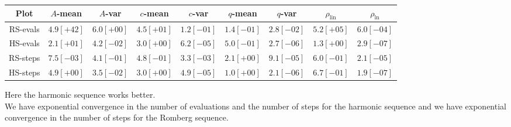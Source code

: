 \begin{table}[H]
    \centering
    \small
    \begin{tabular}{c||c|c|c|c|c|c|c|c}
Plot & \(A\)-mean & \(A\)-var & \(c\)-mean & \(c\)-var & \(q\)-mean & \(q\)-var & \(\rho_{\operatorname{lin}}\) & \(\rho_{\ln}\)\\\hline
\rowcolor{red}
RS-evals & \(4.9[+42]\) & \(6.0[+00]\) & \(4.5[+01]\) & \(1.2[-01]\) & \(1.4[-01]\) & \(2.8[-02]\) & \(5.2[+05]\) & \(6.0[-04]\) \\
\rowcolor{green}
HS-evals & \(2.1[+01]\) & \(4.2[-02]\) & \(3.0[+00]\) & \(6.2[-05]\) & \(5.0[-01]\) & \(2.7[-06]\) & \(1.3[+00]\) & \(2.9[-07]\) \\
\rowcolor{green}
RS-steps & \(7.5[-03]\) & \(4.1[-01]\) & \(4.8[-01]\) & \(3.3[-03]\) & \(2.1[+00]\) & \(9.1[-05]\) & \(6.0[-01]\) & \(2.1[-05]\) \\
\rowcolor{green}
HS-steps & \(4.9[+00]\) & \(3.5[-02]\) & \(3.0[+00]\) & \(4.9[-05]\) & \(1.0[+00]\) & \(2.1[-06]\) & \(6.7[-01]\) & \(1.9[-07]\) \\
    \end{tabular}
    \label{tab:my_label}
\end{table}

Here the harmonic sequence works better.\\

We have exponential convergence in the number of evaluations and the number of steps for the harmonic sequence and we have exponential convergence in the number of steps for the Romberg sequence.

